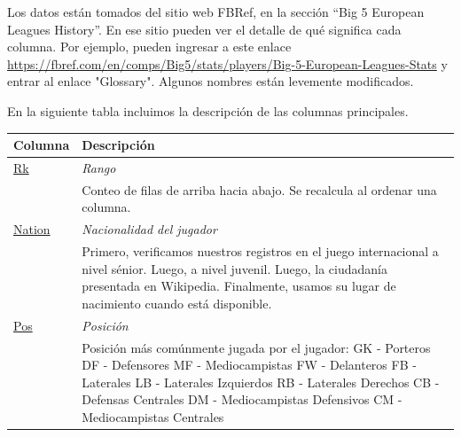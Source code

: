 \documentclass[a4paper,11pt]{article}
\theoremstyle{definition}
\begin{document}
Los datos están tomados del sitio web FBRef, en la sección ``Big 5 European Leagues History''. En ese sitio pueden ver el detalle de qué significa cada columna. Por ejemplo, pueden ingresar a este enlace
\url{https://fbref.com/en/comps/Big5/stats/players/Big-5-European-Leagues-Stats} y entrar al enlace "Glossary". Algunos nombres están levemente modificados.

En la siguiente tabla incluimos la descripción de las columnas principales.



    \begin{longtable}{|l|p{12cm}|}
        \hline
        \textbf{Columna} & \textbf{Descripción} \\
        \hline
        \hyperlink{tooltip:Rk}{Rk} & \textit{Rango} \\
        & Conteo de filas de arriba hacia abajo. Se recalcula al ordenar una columna. \\
        \hline
        \hyperlink{tooltip:Nation}{Nation} & \textit{Nacionalidad del jugador} \\
        & Primero, verificamos nuestros registros en el juego internacional a nivel sénior. Luego, a nivel juvenil. Luego, la ciudadanía presentada en Wikipedia. Finalmente, usamos su lugar de nacimiento cuando está disponible. \\
        \hline
        \hyperlink{tooltip:Pos}{Pos} & \textit{Posición} \\
        & Posición más comúnmente jugada por el jugador:
          \newline GK - Porteros
          \newline DF - Defensores
          \newline MF - Mediocampistas
          \newline FW - Delanteros
          \newline FB - Laterales
          \newline LB - Laterales Izquierdos
          \newline RB - Laterales Derechos
          \newline CB - Defensas Centrales
          \newline DM - Mediocampistas Defensivos
          \newline CM - Mediocampistas Centrales

\end{longtable}
\end{document}
